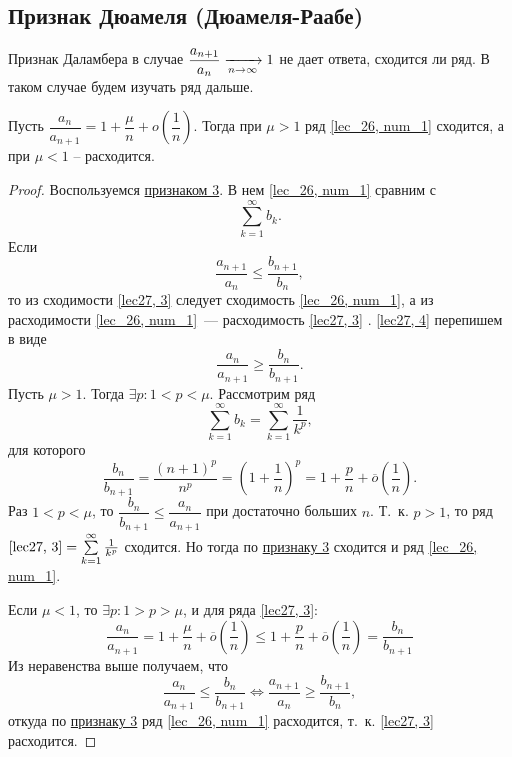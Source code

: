 \documentclass[../../main.tex]{subfiles}
\begin{document}
	\subsection{Признак Дюамеля (Дюамеля-Раабе)}
	
	Признак Даламбера в случае $\dfrac{a_{n+1}}{a_n} \xrightarrow[n\to\infty]{} 1$ не дает 
	ответа, сходится ли ряд. В таком случае будем изучать ряд дальше.
	
	\begin{thm}\label{lec27,duamele_raabe}
		Пусть $\dfrac{a_n}{a_{n+1}} = 1 + \dfrac{\mu}{n} + o\left( 
		\dfrac{1}{n}\right) 
		$. Тогда при $\mu > 1$ ряд \eqref{lec_26, num_1} сходится, а при $\mu < 1$ 
		\--- расходится.
		\begin{proof}
			Воспользуемся \hyperref[lec26:comp_test_3]{признаком 3\textdegree}. В нем 
			\eqref{lec_26, num_1} сравним с 
			\begin{equation} \label{lec27, 3}
			\sum_{k = 1}^{\infty} b_k.
			\end{equation}
			Если \begin{equation}\label{lec27, 4}
			\frac{a_{n+1}}{a_n} \le \frac{b_{n+1}}{b_n},
			\end{equation}
			то из сходимости \eqref{lec27, 3} следует сходимость \eqref{lec_26, num_1}, 
			а 
			из расходимости  \eqref{lec_26, num_1}~--- расходимость \eqref{lec27, 3} . 
			\eqref{lec27, 4} перепишем в виде
			\begin{equation} \label{lec27,(5)}
			\frac{a_n}{a_{n+1}} \ge \frac{b_n}{b_{n+1}}.
			\end{equation}
			Пусть $\mu > 1$. Тогда $\exists p :  1 < p < \mu$. Рассмотрим ряд
			\[  \sum_{k=1}^{\infty} b_k = \sum_{k=1}^{\infty} \frac{1}{k^p},\]
			для которого
			\[ \frac{b_n}{b_{n+1}} = \frac{(n+1)^p}{n^p} = \left( 1 + \frac{1}{n} 
			\right)^p = 1 + \frac{p}{n} + \overline{o}\left( \frac{1}{n} \right).       
			\]
			Раз $1 < p < \mu$, то
			$\dfrac{b_n}{b_{n+1}} \le \dfrac{a_n}{a_{n+1}}$
			при достаточно больших $n$. Т.~к. $p > 1$, то ряд $\eqref{lec27, 3} = 
			\sum\limits_{k=1}^{\infty} \frac{1}{k^p}$ сходится. Но тогда по 
			\hyperref[lec26:comp_test_3]{признаку 3\textdegree} сходится и ряд 
			\eqref{lec_26, num_1}.
			
			Если $\mu < 1$, то $\exists p : 1 > p > \mu$, и для ряда \eqref{lec27, 3}:
			\[  \frac{a_n}{a_{n+1}} = 1 + \frac{\mu}{n} + \overline{o}\left( 
			\frac{1}{n} \right) \le  1 + \frac{p}{n} + \overline{o}\left( \frac{1}{n} 
			\right) = \frac{b_n}{b_{n+1}}                   \]
			Из неравенства выше получаем, что
			\[\frac{a_n}{a_{n+1}} \le \frac{b_n}{b_{n+1}} \iff \frac{a_{n+1}}{a_n} \ge 
			\frac{b_{n+1}}{b_n},\]
			откуда по \hyperref[lec26:comp_test_3]{признаку 3\textdegree} ряд 
			\eqref{lec_26, num_1} расходится, т.~к. 
			\eqref{lec27, 3} расходится.
		\end{proof}
	\end{thm}	
	
\end{document}

